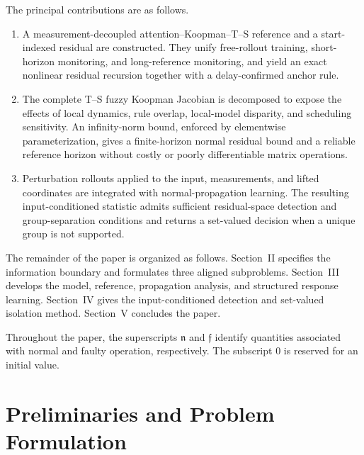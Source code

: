 \documentclass[journal]{IEEEtran}
\newcommand{\1}{\bm 1}
\begin{document}
The principal contributions are as follows.
\begin{enumerate}
\item A measurement-decoupled attention--Koopman--T--S reference and a
start-indexed residual are constructed. They unify free-rollout training,
short-horizon monitoring, and long-reference monitoring, and yield an exact
nonlinear residual recursion together with a delay-confirmed anchor rule.

\item The complete T--S fuzzy Koopman Jacobian is decomposed to expose the
effects of local dynamics, rule overlap, local-model disparity, and scheduling
sensitivity. An infinity-norm bound, enforced by elementwise parameterization,
gives a finite-horizon normal residual bound and a reliable reference horizon
without costly or poorly differentiable matrix operations.

\item Perturbation rollouts applied to the input, measurements, and lifted
coordinates are integrated with normal-propagation learning. The resulting
input-conditioned statistic admits sufficient residual-space detection and
group-separation conditions and returns a set-valued decision when a unique
group is not supported.
\end{enumerate}

The remainder of the paper is organized as follows. Section~II specifies the
information boundary and formulates three aligned subproblems. Section~III
develops the model, reference, propagation analysis, and structured response
learning. Section~IV gives the input-conditioned detection and set-valued
isolation method. Section~V concludes the paper.

Throughout the paper, the superscripts $\mathfrak n$ and $\mathfrak f$
identify quantities associated with normal and faulty operation,
respectively. The subscript $0$ is reserved for an initial value.

\section{Preliminaries and Problem Formulation}
\end{document}
